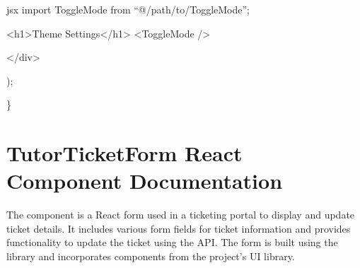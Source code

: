 \documentclass[letterpaper,10pt,english]{sphinxmanual}
\begin{document}
\sphinxAtStartPar
{\color{red}\bfseries{}\textasciigrave{}\textasciigrave{}}{\color{red}\bfseries{}\textasciigrave{}}jsx
import ToggleMode from “@/path/to/ToggleMode”;
\begin{description}
\begin{description}
\begin{description}
\sphinxAtStartPar
\textless{}h1\textgreater{}Theme Settings\textless{}/h1\textgreater{}
\textless{}ToggleMode /\textgreater{}

\end{description}

\sphinxAtStartPar
\textless{}/div\textgreater{}

\end{description}

\sphinxAtStartPar
);

\end{description}

\sphinxAtStartPar
\}

\sphinxstepscope


\section{TutorTicketForm React Component Documentation}
\label{\detokenize{forms/tutor:tutorticketform-react-component-documentation}}\label{\detokenize{forms/tutor::doc}}
\sphinxAtStartPar
The  component is a React form used in a ticketing portal to display and update ticket details. It includes various form fields for ticket information and provides functionality to update the ticket using the  API. The form is built using the  library and incorporates components from the project’s UI library.
\end{document}
